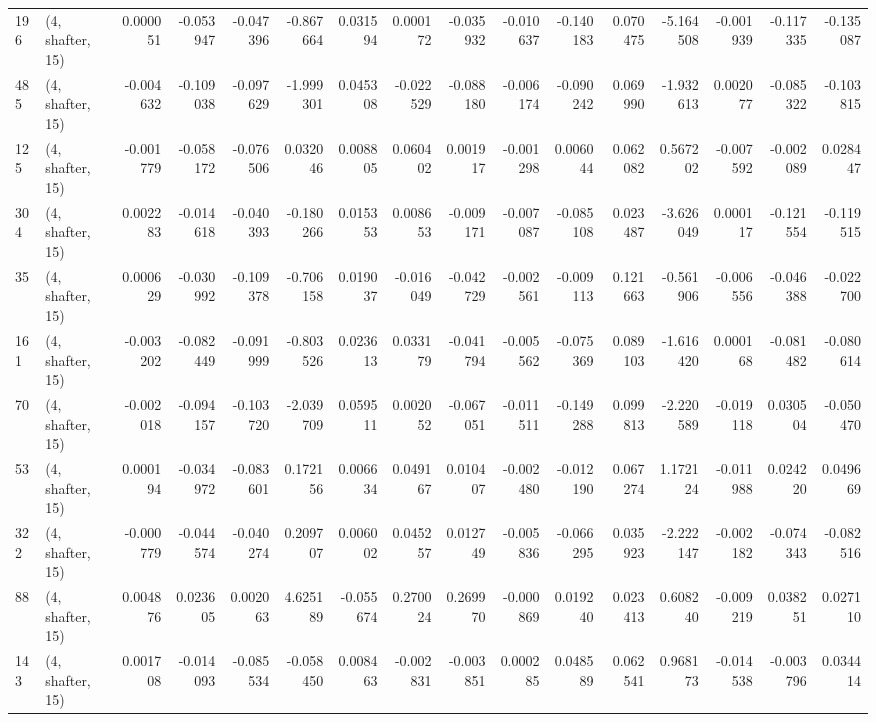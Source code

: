 \begin{tabular}{llrrrrrrrrrrrrrr}
196 &  (4, shafter, 15) &   0.000051 & -0.053947 & -0.047396 &  -0.867664 &  0.031594 &   0.000172 & -0.035932 & -0.010637 & -0.140183 &  0.070475 &    -5.164508 &  -0.001939 &  -0.117335 &  -0.135087 \\
485 &  (4, shafter, 15) &  -0.004632 & -0.109038 & -0.097629 &  -1.999301 &  0.045308 &  -0.022529 & -0.088180 & -0.006174 & -0.090242 &  0.069990 &    -1.932613 &   0.002077 &  -0.085322 &  -0.103815 \\
125 &  (4, shafter, 15) &  -0.001779 & -0.058172 & -0.076506 &   0.032046 &  0.008805 &   0.060402 &  0.001917 & -0.001298 &  0.006044 &  0.062082 &     0.567202 &  -0.007592 &  -0.002089 &   0.028447 \\
304 &  (4, shafter, 15) &   0.002283 & -0.014618 & -0.040393 &  -0.180266 &  0.015353 &   0.008653 & -0.009171 & -0.007087 & -0.085108 &  0.023487 &    -3.626049 &   0.000117 &  -0.121554 &  -0.119515 \\
35  &  (4, shafter, 15) &   0.000629 & -0.030992 & -0.109378 &  -0.706158 &  0.019037 &  -0.016049 & -0.042729 & -0.002561 & -0.009113 &  0.121663 &    -0.561906 &  -0.006556 &  -0.046388 &  -0.022700 \\
161 &  (4, shafter, 15) &  -0.003202 & -0.082449 & -0.091999 &  -0.803526 &  0.023613 &   0.033179 & -0.041794 & -0.005562 & -0.075369 &  0.089103 &    -1.616420 &   0.000168 &  -0.081482 &  -0.080614 \\
70  &  (4, shafter, 15) &  -0.002018 & -0.094157 & -0.103720 &  -2.039709 &  0.059511 &   0.002052 & -0.067051 & -0.011511 & -0.149288 &  0.099813 &    -2.220589 &  -0.019118 &   0.030504 &  -0.050470 \\
53  &  (4, shafter, 15) &   0.000194 & -0.034972 & -0.083601 &   0.172156 &  0.006634 &   0.049167 &  0.010407 & -0.002480 & -0.012190 &  0.067274 &     1.172124 &  -0.011988 &   0.024220 &   0.049669 \\
322 &  (4, shafter, 15) &  -0.000779 & -0.044574 & -0.040274 &   0.209707 &  0.006002 &   0.045257 &  0.012749 & -0.005836 & -0.066295 &  0.035923 &    -2.222147 &  -0.002182 &  -0.074343 &  -0.082516 \\
88  &  (4, shafter, 15) &   0.004876 &  0.023605 &  0.002063 &   4.625189 & -0.055674 &   0.270024 &  0.269970 & -0.000869 &  0.019240 &  0.023413 &     0.608240 &  -0.009219 &   0.038251 &   0.027110 \\
143 &  (4, shafter, 15) &   0.001708 & -0.014093 & -0.085534 &  -0.058450 &  0.008463 &  -0.002831 & -0.003851 &  0.000285 &  0.048589 &  0.062541 &     0.968173 &  -0.014538 &  -0.003796 &   0.034414 \\

\end{tabular}
